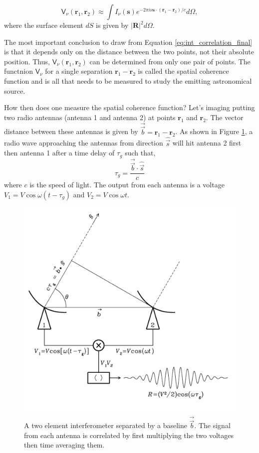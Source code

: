 \begin{equation}
\label{eq:int_correlation_final}
\mathsf{V}_\nu (\mathbf{r}_1, \mathbf{r}_2) \approx \int I_\nu(\mathbf{s}) e^{-2 \pi i \nu\mathbf{s} \cdot (\mathbf{r}_1 - \mathbf{r}_2)/c} d\Omega,
\end{equation}
where the surface element $dS$ is given by $\vert \mathbf{R} \vert ^2 d\Omega$.

The most important conclusion to draw from Equation \ref{eq:int_correlation_final} is that it depends only on the distance between the two points, not their absolute position. Thus, $\mathsf{V}_\nu (\mathbf{r}_1, \mathbf{r}_2)$ can be determined from only one pair of points. The functnion $\mathsf{V}_\nu$ for a single separation $\mathbf{r}_1 - \mathbf{r}_2$ is called the spatial coherence function and is all that needs to be measured to study the emitting astronomical source.

How then does one measure the spatial coherence function? Let's imaging putting two radio antennas (antenna 1 and antenna 2) at points $\mathbf{r}_1$ and $\mathbf{r}_2$. The vector distance between these antennas is given by $\overrightarrow{\Vec{b}} = \mathbf{r}_1 - \mathbf{r}_2$. As shown in Figure \ref{fig:2_el_int}, a radio wave approaching the antennas from direction $\hat{\Vec{s}}$  will hit antenna 2 first then antenna 1 after a time delay of $\tau_g$ such that,
$$\tau_g = \frac{\overrightarrow{\Vec{b}} \cdot \hat{\Vec{s}}}{c} $$
where $c$ is the speed of light. The output from each antenna is a voltage $V_1 = V \cos{\omega(t - \tau_g)}$ and $V_2 = V\cos{\omega t}$. 

\begin{figure}
    \centering
    \includegraphics[width=\columnwidth]{Images/2_elem_int.png}
    \caption[A two element interferometer]{A two element interferometer separated by a baseline $\overrightarrow{\Vec{b}}$. The signal from each antenna is correlated by first multiplying the two voltages then time averaging them.}
    \label{fig:2_el_int}
\end{figure}


